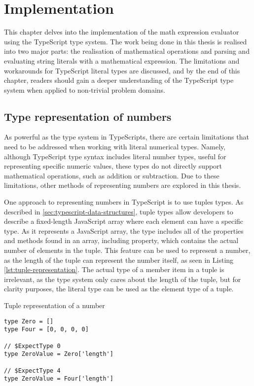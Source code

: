 \chapter{Implementation}

This chapter delves into the implementation of the math expression evaluator using the TypeScript type system. The work being done in this thesis is realised into two major parts: the realisation of mathematical operations and parsing and evaluating string literals with a mathematical expression. The limitations and workarounds for TypeScript literal types are discussed, and by the end of this chapter, readers should gain a deeper understanding of the TypeScript type system when applied to non-trivial problem domains.

\section{Type representation of numbers}

As powerful as the type system in TypeScripts, there are certain limitations that need to be addressed when working with literal numerical types. Namely, although TypeScript type syntax includes literal number types, useful for representing specific numeric values, these types do not directly support mathematical operations, such as addition or subtraction. Due to these limitations, other methods of representing numbers are explored in this thesis.

One approach to representing numbers in TypeScript is to use tuples types. As described in \ref{sec:typescript-data-structures}, tuple types allow developers to describe a fixed-length JavaScript array where each element can have a specific type. As it represents a JavaScript array, the type includes all of the properties and methods found in an array, including  property, which contains the actual number of elements in the tuple. This feature can be used to represent a number, as the length of the tuple can represent the number itself, as seen in Listing \ref{lst:tuple-representation}. The actual type of a member item in a tuple is irrelevant, as the type system only cares about the length of the tuple, but for clarity purposes, the literal type  can be used as the element type of a tuple.

\begin{listing}[ht]
  \caption{Tuple representation of a number}\label{lst:tuple-representation}
  \begin{verbatim}
type Zero = []
type Four = [0, 0, 0, 0] 

// $ExpectType 0
type ZeroValue = Zero['length']

// $ExpectType 4
type ZeroValue = Four['length']
\end{verbatim}
\end{listing}

